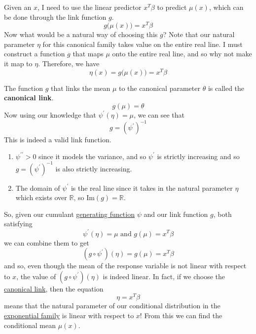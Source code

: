     Given an $x$, I need to use the linear predictor $x^T \beta$ to predict $\mu(x)$, which can be done through the link function $g$. 
    \begin{equation}
      g\big( \mu(x) \big) = x^T \beta
    \end{equation}
    Now what would be a natural way of choosing this $g$? Note that our natural parameter $\eta$ for this canonical family takes value on the entire real line. I must construct a function $g$ that maps $\mu$ onto the entire real line, and so why not make it map to $\eta$. Therefore, we have 
    \begin{equation}
      \eta(x) = g\big( \mu(x) \big) = x^T \beta
    \end{equation}

    \begin{definition}
      \label{def:canonical-link}
    The function $g$ that links the mean $\mu$ to the canonical parameter $\theta$ is called the \textbf{canonical link}. 
    \begin{equation}
      g(\mu) = \theta
    \end{equation}
    Now using our knowledge that $\psi^\prime(\eta) = \mu$, we can see that 
    \begin{equation}
      g = (\psi^\prime)^{-1}
    \end{equation}
    This is indeed a valid link function. 
    \begin{enumerate}
        \item $\psi^{\prime\prime} > 0$ since it models the variance, and so $\psi^\prime$ is strictly increasing and so $g = (\psi^\prime)^{-1}$ is also strictly increasing. 
        \item The domain of $\psi^\prime$ is the real line since it takes in the natural parameter $\eta$ which exists over $\mathbb{R}$, so $\mathrm{Im}(g) = \mathbb{R}$. 
    \end{enumerate}
    \end{definition}

    So, given our cumulant \hyperref[sp-def:generating-function]{generating function} $\psi$ and our link function $g$, both satisfying 
    \begin{equation}
      \psi^\prime (\eta) = \mu \text{ and } g(\mu) = x^T \beta
    \end{equation}
    we can combine them to get 
    \begin{equation}
      (g \circ \psi^\prime) (\eta) = g(\mu) = x^T \beta
    \end{equation}
    and so, even though the mean of the response variable is not linear with respect to $x$, the value of $(g \circ \psi^\prime) (\eta)$ is indeed linear. In fact, if we choose the \hyperref[def:canonical-link]{canonical link}, then the equation 
    \begin{equation}
      \eta = x^T \beta
    \end{equation}
    means that the natural parameter of our conditional distribution in the \hyperref[def:exponential-family]{exponential family} is linear with respect to $x$! From this we can find the conditional mean $\mu(x)$. 


